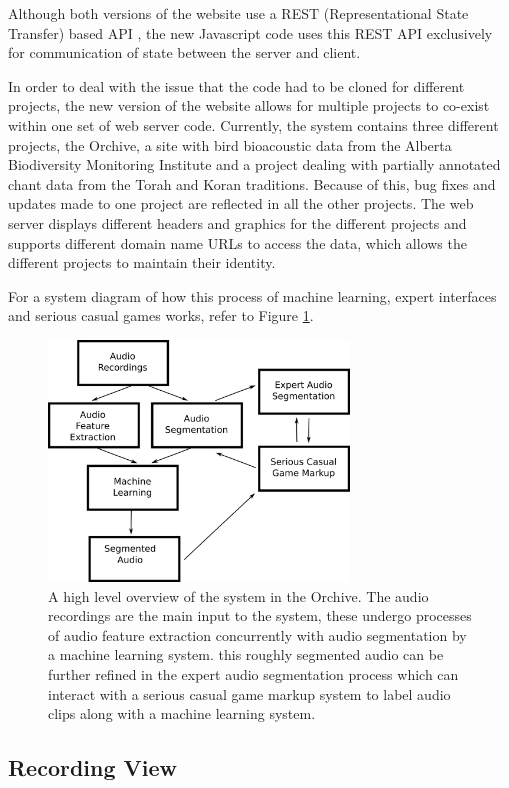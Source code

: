 Although both versions of the website use a REST (Representational
State Transfer) based API \cite{fieldingphd}, the new Javascript code
uses this REST API exclusively for communication of state between the
server and client.

In order to deal with the issue that the code had to be cloned for
different projects, the new version of the website allows for multiple
projects to co-exist within one set of web server code.  Currently, the
system contains three different projects, the Orchive, a site with
bird bioacoustic data from the Alberta Biodiversity Monitoring
Institute and a project dealing with partially annotated chant data
from the Torah and Koran traditions.  Because of this, bug fixes and
updates made to one project are reflected in all the other projects.
The web server displays different headers and graphics for the
different projects and supports different domain name URLs to access
the data, which allows the different projects to maintain their
identity.

For a system diagram of how this process of machine learning, expert
interfaces and serious casual games works, refer to Figure
\ref{fig:systemDiagram}.

\begin{figure}
\centering
\includegraphics[width=80mm]{figures/systemDiagram}
\caption{A high level overview of the system in the Orchive.  The
  audio recordings are the main input to the system, these undergo
  processes of audio feature extraction concurrently with audio
  segmentation by a machine learning system.  this roughly segmented
  audio can be further refined in the expert audio segmentation
  process which can interact with a serious casual game markup system
  to label audio clips along with a machine learning system.}
\label{fig:systemDiagram} 
\end{figure} 


\subsection{Recording View}

